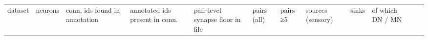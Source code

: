 \documentclass[11pt]{article}
\newcounter{none}
\begin{document}
{\def\LTcaptype{none} %
\begin{longtable}[]{@{}
  >{\raggedright\arraybackslash}p{}
  >{\raggedright\arraybackslash}p{}
  >{\raggedright\arraybackslash}p{}
  >{\raggedright\arraybackslash}p{}
  >{\raggedright\arraybackslash}p{}
  >{\raggedright\arraybackslash}p{}
  >{\raggedright\arraybackslash}p{}
  >{\raggedright\arraybackslash}p{}
  >{\raggedright\arraybackslash}p{}
  >{\raggedright\arraybackslash}p{}
  >{\raggedright\arraybackslash}p{}
  >{\raggedright\arraybackslash}p{}@{}}
\toprule\noalign{}
\begin{minipage}[b]{\linewidth}\raggedright
dataset
\end{minipage} & \begin{minipage}[b]{\linewidth}\raggedright
neurons
\end{minipage} & \begin{minipage}[b]{\linewidth}\raggedright
conn. ids found in annotation
\end{minipage} & \begin{minipage}[b]{\linewidth}\raggedright
annotated ids present in conn.
\end{minipage} & \begin{minipage}[b]{\linewidth}\raggedright
pair-level synapse floor in file
\end{minipage} & \begin{minipage}[b]{\linewidth}\raggedright
pairs (all)
\end{minipage} & \begin{minipage}[b]{\linewidth}\raggedright
pairs ≥5
\end{minipage} & \begin{minipage}[b]{\linewidth}\raggedright
sources (sensory)
\end{minipage} & \begin{minipage}[b]{\linewidth}\raggedright
sinks
\end{minipage} & \begin{minipage}[b]{\linewidth}\raggedright
of which DN / MN

\end{minipage}
\end{longtable}}
\end{document}
